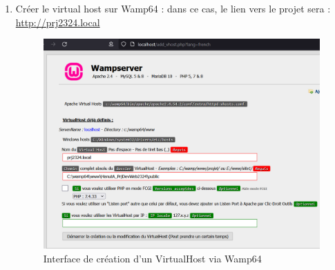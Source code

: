 \begin{enumerate}
	\newpage
	\item Créer le virtual host sur Wamp64 : dans ce cas, le lien vers le projet sera : \\ \url{http://prj2324.local}
	\begin{figure}[h]
		\centering
		\includegraphics[keepaspectratio,width=15cm]{images/VirtualHost}
		\caption{Interface de création d'un VirtualHost via Wamp64}
	\end{figure}
\end{enumerate}